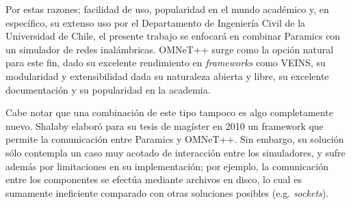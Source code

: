 Por estas razones; facilidad de uso, popularidad en el mundo académico y, en específico, su extenso uso por el Departamento de Ingeniería Civil de la Universidad de Chile, el presente trabajo se enfocará en combinar Paramics con un simulador de redes inalámbricas. OMNeT++ surge como la opción natural para este fin, dado su excelente rendimiento en \textit{frameworks} como VEINS, su modularidad y extensibilidad dada su naturaleza abierta y libre, su excelente documentación y su popularidad en la academia.

Cabe notar que una combinación de este tipo tampoco es algo completamente nuevo. Shalaby elaboró para su tesis de magíster en 2010 \autocite{shalaby} un framework que permite la comunicación entre Paramics y OMNeT++. Sin embargo, su solución sólo contempla un caso muy acotado de interacción entre los simuladores, y sufre además por limitaciones en su implementación; por ejemplo, la comunicación entre los componentes se efectúa mediante archivos en disco, lo cual es sumamente ineficiente comparado con otras soluciones posibles (e.g. \textit{sockets}).
